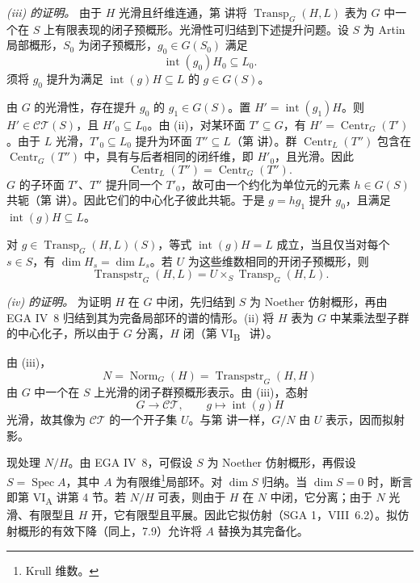 \medskip\noindent\textit{(iii) 的证明。}
由于 \(H\) 光滑且纤维连通，第  讲将 \(\operatorname{Transp}_G(H,L)\) 表为 \(G\) 中一个在 \(S\) 上有限表现的闭子预概形。光滑性可归结到下述提升问题。设 \(S\) 为 Artin 局部概形，\(S_0\) 为闭子预概形，\(g_0\in G(S_0)\) 满足
\[
  \operatorname{int}(g_0)H_0\subseteq L_0.
\]
须将 \(g_0\) 提升为满足 \(\operatorname{int}(g)H\subseteq L\) 的 \(g\in G(S)\)。

由 \(G\) 的光滑性，存在提升 \(g_0\) 的 \(g_1\in G(S)\)。置 \(H'=\operatorname{int}(g_1)H\)。则 \(H'\in\mathcal{CT}(S)\)，且 \(H'_0\subseteq L_0\)。由 (ii)，对某环面 \(T'\subseteq G\)，有 \(H'=\operatorname{Centr}_G(T')\)。由于 \(L\) 光滑，\(T'_0\subseteq L_0\) 提升为环面 \(T''\subseteq L\)（第  讲）。群 \(\operatorname{Centr}_L(T'')\) 包含在 \(\operatorname{Centr}_G(T'')\) 中，具有与后者相同的闭纤维，即 \(H'_0\)，且光滑。因此
\[
 \operatorname{Centr}_L(T'')
 =\operatorname{Centr}_G(T'').
\]
\(G\) 的子环面 \(T'\)、\(T''\) 提升同一个 \(T'_0\)，故可由一个约化为单位元的元素 \(h\in G(S)\) 共轭（第  讲）。因此它们的中心化子彼此共轭。于是 \(g=hg_1\) 提升 \(g_0\)，且满足 \(\operatorname{int}(g)H\subseteq L\)。

对 \(g\in\operatorname{Transp}_G(H,L)(S)\)，等式 \(\operatorname{int}(g)H=L\) 成立，当且仅当对每个 \(s\in S\)，有 \(\dim H_s=\dim L_s\)。若 \(U\) 为这些维数相同的开闭子预概形，则
\[
 \operatorname{Transpstr}_G(H,L)
 =U\times_S\operatorname{Transp}_G(H,L).
\]

\medskip\noindent\textit{(iv) 的证明。}
为证明 \(H\) 在 \(G\) 中闭，先归结到 \(S\) 为 Noether 仿射概形，再由 EGA IV~8 归结到其为完备局部环的谱的情形。(ii) 将 \(H\) 表为 \(G\) 中某乘法型子群的中心化子，所以由于 \(G\) 分离，\(H\) 闭（第 VI\textsubscript{B}~ 讲）。

由 (iii)，
\[
 N=\operatorname{Norm}_G(H)
  =\operatorname{Transpstr}_G(H,H)
\]
由 \(G\) 中一个在 \(S\) 上光滑的闭子群预概形表示。由 (iii)，态射
\[
  G\longrightarrow\mathcal{CT},
  \qquad g\longmapsto\operatorname{int}(g)H
\]
光滑，故其像为 \(\mathcal{CT}\) 的一个开子集 \(U\)。与第  讲一样，\(G/N\) 由 \(U\) 表示，因而拟射影。

现处理 \(N/H\)。由 EGA IV~8，可假设 \(S\) 为 Noether 仿射概形，再假设 \(S=\operatorname{Spec}A\)，其中 \(A\) 为有限维\footnote{Krull 维数。}局部环。对 \(\dim S\) 归纳。当 \(\dim S=0\) 时，断言即第 VI\textsubscript{A} 讲第 4 节。若 \(N/H\) 可表，则由于 \(H\) 在 \(N\) 中闭，它分离；由于 \(N\) 光滑、有限型且 \(H\) 开，它有限型且平展。因此它拟仿射（SGA 1，VIII~6.2）。拟仿射概形的有效下降（同上，7.9）允许将 \(A\) 替换为其完备化。

